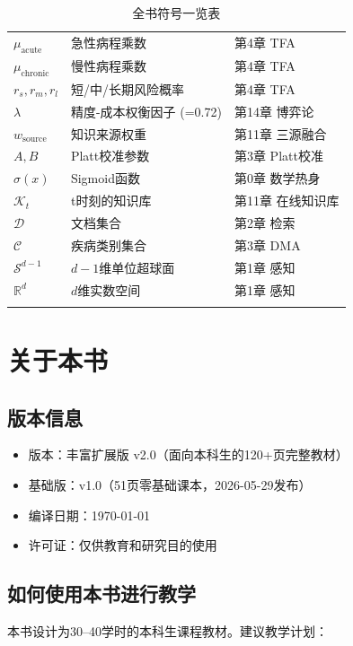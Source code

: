 \documentclass[11pt,a4paper]{ctexart}
\begin{document}
\begin{longtable}{p{2cm}p{3.5cm}p{8.5cm}}
$\mu_{\text{acute}}$ & 急性病程乘数 & 第4章 TFA\\
$\mu_{\text{chronic}}$ & 慢性病程乘数 & 第4章 TFA\\
$r_s, r_m, r_l$ & 短/中/长期风险概率 & 第4章 TFA\\
$\lambda$ & 精度-成本权衡因子 (=0.72) & 第14章 博弈论\\
$w_{\text{source}}$ & 知识来源权重 & 第11章 三源融合\\
$A, B$ & Platt校准参数 & 第3章 Platt校准\\
$\sigma(x)$ & Sigmoid函数 & 第0章 数学热身\\
$\mathcal{K}_t$ & t时刻的知识库 & 第11章 在线知识库\\
$\mathcal{D}$ & 文档集合 & 第2章 检索\\
$\mathcal{C}$ & 疾病类别集合 & 第3章 DMA\\
$\mathcal{S}^{d-1}$ & $d-1$维单位超球面 & 第1章 感知\\
$\mathbb{R}^d$ & $d$维实数空间 & 第1章 感知\\
\caption{全书符号一览表}
\end{longtable}
\normalsize

\newpage

\section*{关于本书}

\subsection*{版本信息}

\begin{itemize}[nosep]
\item 版本：丰富扩展版 v2.0（面向本科生的120+页完整教材）
\item 基础版：v1.0（51页零基础课本，2026-05-29发布）
\item 编译日期：\today
\item 许可证：仅供教育和研究目的使用
\end{itemize}

\subsection*{如何使用本书进行教学}

本书设计为30--40学时的本科生课程教材。建议教学计划：
\end{document}
